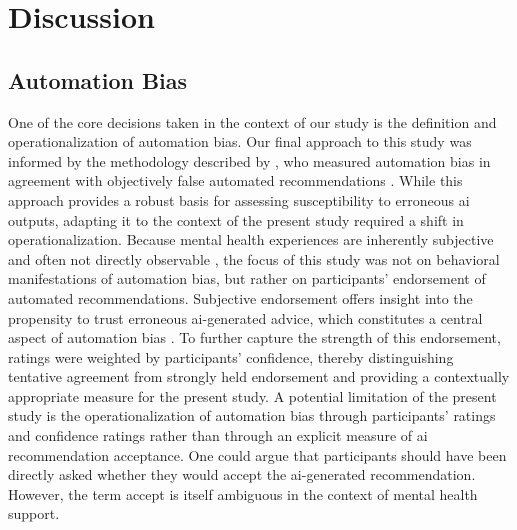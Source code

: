 \documentclass[sigconf,natbib=false]{acmart}
\begin{document}
\section{Discussion}

\subsection{Automation Bias}

One of the core decisions taken in the context of our study is the definition and operationalization of automation bias.
Our final approach to this study was informed by the methodology described by \citeauthor[]{kucking_automation_2026}, who measured automation bias in agreement with objectively false automated recommendations \autocite[]{kucking_automation_2026}.
While this approach provides a robust basis for assessing susceptibility to erroneous \Gls{ai} outputs, adapting it to the context of the present study required a shift in operationalization.
Because mental health experiences are inherently subjective and often not directly observable \autocite[]{mocnik_multimodal_2025}, the focus of this study was not on behavioral manifestations of automation bias, but rather on participants’ endorsement of automated recommendations.
Subjective endorsement offers insight into the propensity to trust erroneous \Gls{ai}-generated advice, which constitutes a central aspect of automation bias \autocite[]{parasuraman_complacency_2010}.
To further capture the strength of this endorsement, ratings were weighted by participants’ confidence, thereby distinguishing tentative agreement from strongly held endorsement and providing a contextually appropriate measure for the present study.
A potential limitation of the present study is the operationalization of automation bias through participants’ ratings and confidence ratings rather than through an explicit measure of \Gls{ai} recommendation acceptance.
One could argue that participants should have been directly asked whether they would accept the \Gls{ai}-generated recommendation.
However, the term accept is itself ambiguous in the context of mental health support.
\end{document}
